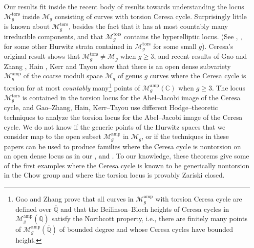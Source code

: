 \documentclass[reqno,10pt]{amsart}
\theoremstyle{definition}
\theoremstyle{definition}
\def\C{{\mathbb C}}
\def\Q{{\mathbb Q}}
\def\C{{\mathbb C}}
\DeclareMathOperator{\tors}{tors}
\DeclareMathOperator{\amp}{amp}
\begin{document}
Our results fit inside the recent body of results towards understanding the locus $\mathcal{M}_{g}^{\tors}$ inside $\mathcal{M}_g$ consisting of curves with torsion Ceresa cycle. Surprisingly little is known about $\mathcal{M}_{g}^{\tors}$, besides the fact that it has at most countably many irreducible components, and that $\mathcal{M}_{g}^{\tors}$ contains the hyperelliptic locus. (See \cite{AriJef2}, \cite{QiuZhang}, \cite{Laterveer} for some other Hurwitz strata contained in $\mathcal{M}_g^{\tors}$ for some small $g$). Ceresa's original result shows that $\mathcal{M}_{g}^{\tors} \neq \mathcal{M}_g$ when $g \geq 3$, and recent results of  Gao and Zhang \cite{GaoZhang}, Hain \cite{Hain}, Kerr and Tayou \cite{KerrTayou} show that there is an open dense subvariety $\mathcal{M}_g^{\amp}$ of the coarse moduli space $\mathcal{M}_g$ of genus $g$ curves where the Ceresa cycle is torsion for at most {\textit{countably}} many\footnote{Gao and Zhang prove that all curves in $\mathcal{M}_g^{\amp}$ with torsion Ceresa cycle are defined over $\overline{\mathbb{\Q}}$ and that the Beilinson--Bloch heights of Ceresa cycles in $\mathcal{M}_g^{\amp}(\overline{\Q})$ satisfy the Northcott property, i.e., there are finitely many points of $\mathcal{M}_g^{\amp}(\overline{\Q})$ of bounded degree and whose Ceresa cycles have bounded height.} points of $\mathcal{M}_g^{\amp}(\C)$ when $g \geq 3$.  
The locus $\mathcal{M}_g^{\tors}$ is contained in the torsion locus for the Abel--Jacobi image of the Ceresa cycle, and Gao--Zhang, Hain, Kerr--Tayou use different Hodge--theoretic techniques to analyze the torsion locus for the Abel--Jacobi image of the Ceresa cycle. We do not know if the generic points of the Hurwitz spaces that we consider map to the open subset $\mathcal{M}_g^{\amp}$ in $\mathcal{M}_g$, or if the techniques in these papers can be used to produce families where the Ceresa cycle is nontorsion on an open dense locus as in our ,  and . To our knowledge, these theorems give some of the first examples where the Ceresa cycle is known to be generically nontorsion in the Chow group and where the torsion locus is provably Zariski closed. 
\end{document}
